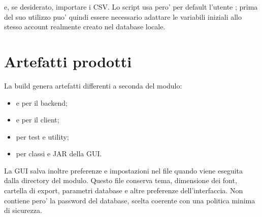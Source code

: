 e, se desiderato, importare i CSV. Lo script  usa pero' per
default l'utente ; prima del suo utilizzo puo' quindi essere necessario
adattare le variabili iniziali allo stesso account realmente creato nel database locale.

\section{Artefatti prodotti}

La build genera artefatti differenti a seconda del modulo:

\begin{itemize}
  \item {} e  per il backend;
  \item {} e  per il client;
  \item {} per test e utility;
  \item {} per classi e JAR della GUI.
\end{itemize}

La GUI salva inoltre preferenze e impostazioni nel file 
quando viene eseguita dalla directory del modulo. Questo file conserva tema, dimensione
dei font, cartella di export, parametri database e altre preferenze dell'interfaccia. Non
contiene pero' la password del database, scelta coerente con una politica minima di sicurezza.
